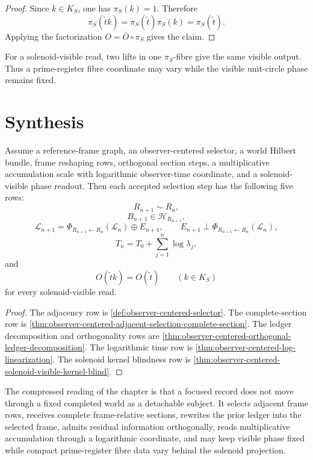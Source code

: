 \begin{proof}
Since $k\in K_S$, one has $\pi_S(k)=1$. Therefore
$$
\pi_S(\widetilde t k)
=
\pi_S(\widetilde t)\pi_S(k)
=
\pi_S(\widetilde t).
$$
Applying the factorization $O=\bar O\circ\pi_S$ gives the claim.
\end{proof}

\begin{corollary}
\label{cor:observer-centered-visible-phase-hides-fibre-motion}
For a solenoid-visible read, two lifts in one $\pi_S$-fibre give the same
visible output. Thus a prime-register fibre coordinate may vary while the
visible unit-circle phase remains fixed.
\end{corollary}

\section{Synthesis}
\label{sec:observer-centered-logarithmic-section-synthesis}

\begin{theorem}
\label{thm:observer-centered-logarithmic-section-dynamics}
Assume a reference-frame graph, an observer-centered selector, a world
Hilbert bundle, frame reshaping rows, orthogonal section steps, a
multiplicative accumulation scale with logarithmic observer-time
coordinate, and a solenoid-visible phase readout. Then each accepted
selection step has the following five rows:
$$
R_{n+1}\sim R_n,
$$
$$
B_{n+1}\in\mathcal H_{R_{n+1}},
$$
$$
\mathcal L_{n+1}
=
\Phi_{R_{n+1}\leftarrow R_n}(\mathcal L_n)
\oplus
E_{n+1},
\qquad
E_{n+1}\perp
\Phi_{R_{n+1}\leftarrow R_n}(\mathcal L_n),
$$
$$
T_n=T_0+\sum_{j=1}^{n}\log\lambda_j,
$$
and
$$
O(\widetilde t k)=O(\widetilde t)
\qquad
(k\in K_S)
$$
for every solenoid-visible read.
\end{theorem}

\begin{proof}
The adjacency row is \autoref{def:observer-centered-selector}. The
complete-section row is
\autoref{thm:observer-centered-adjacent-selection-complete-section}. The
ledger decomposition and orthogonality rows are
\autoref{thm:observer-centered-orthogonal-ledger-decomposition}. The
logarithmic time row is
\autoref{thm:observer-centered-log-linearization}. The solenoid kernel
blindness row is
\autoref{thm:observer-centered-solenoid-visible-kernel-blind}.
\end{proof}

\begin{principle}
\label{prin:observer-centered-frame-centered-reading}
The compressed reading of the chapter is that a focused record does not
move through a fixed completed world as a detachable subject. It selects
adjacent frame rows, receives complete frame-relative sections, rewrites
the prior ledger into the selected frame, admits residual information
orthogonally, reads multiplicative accumulation through a logarithmic
coordinate, and may keep visible phase fixed while compact
prime-register fibre data vary behind the solenoid projection.
\end{principle}
